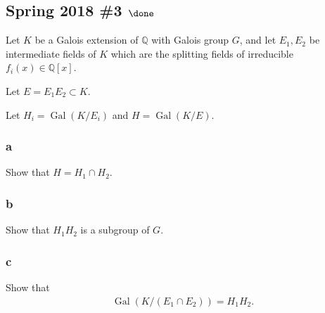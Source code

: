 \hypertarget{spring-2018-3-done}{%
\subsection{\texorpdfstring{Spring 2018 \#3
\(\done\)}{Spring 2018 \#3 \textbackslash done}}\label{spring-2018-3-done}}

Let \(K\) be a Galois extension of \({\mathbb{Q}}\) with Galois group
\(G\), and let \(E_1 , E_2\) be intermediate fields of \(K\) which are
the splitting fields of irreducible \(f_i (x) \in {\mathbb{Q}}[x]\).

Let \(E = E_1 E_2 \subset K\).

Let \(H_i = \operatorname{Gal}(K/E_i)\) and
\(H = \operatorname{Gal}(K/E)\).

\hypertarget{a-61}{%
\subsubsection{a}\label{a-61}}

Show that \(H = H_1 \cap H_2\).

\hypertarget{b-51}{%
\subsubsection{b}\label{b-51}}

Show that \(H_1 H_2\) is a subgroup of \(G\).

\hypertarget{c-35}{%
\subsubsection{c}\label{c-35}}

Show that
\begin{align*}
\operatorname{Gal}(K/(E_1 \cap E_2 )) = H_1 H_2
.\end{align*}

